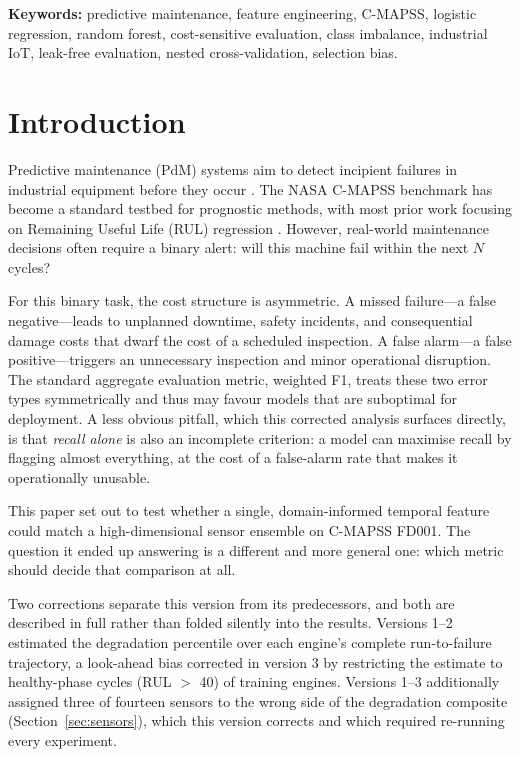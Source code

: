 \documentclass[10pt,twocolumn]{article}
\begin{document}
\noindent\textbf{Keywords:} predictive maintenance, feature engineering, C-MAPSS,
logistic regression, random forest, cost-sensitive evaluation, class imbalance,
industrial IoT, leak-free evaluation, nested cross-validation, selection bias.

\section{Introduction}
\label{sec:intro}

Predictive maintenance (PdM) systems aim to detect incipient failures in industrial
equipment before they occur \cite{jardine2006review}.
The NASA C-MAPSS benchmark \cite{saxena2008damage} has become a standard testbed for
prognostic methods, with most prior work focusing on Remaining Useful Life (RUL)
regression \cite{li2018remaining}.
However, real-world maintenance decisions often require a binary alert: will this
machine fail within the next $N$ cycles?

For this binary task, the cost structure is asymmetric.
A missed failure---a false negative---leads to unplanned downtime, safety incidents,
and consequential damage costs that dwarf the cost of a scheduled inspection.
A false alarm---a false positive---triggers an unnecessary inspection and minor
operational disruption.
The standard aggregate evaluation metric, weighted F1, treats these two error types
symmetrically and thus may favour models that are suboptimal for deployment.
A less obvious pitfall, which this corrected analysis surfaces directly, is that
\emph{recall alone} is also an incomplete criterion: a model can maximise recall by
flagging almost everything, at the cost of a false-alarm rate that makes it
operationally unusable.

This paper set out to test whether a single, domain-informed temporal feature could
match a high-dimensional sensor ensemble on C-MAPSS FD001. The question it ended up
answering is a different and more general one: which metric should decide that
comparison at all.

Two corrections separate this version from its predecessors, and both are described in
full rather than folded silently into the results. Versions 1--2 estimated the
degradation percentile over each engine's complete run-to-failure trajectory, a
look-ahead bias corrected in version 3 by restricting the estimate to healthy-phase
cycles (RUL $>$ 40) of training engines. Versions 1--3 additionally assigned three of
fourteen sensors to the wrong side of the degradation composite
(Section~\ref{sec:sensors}), which this version corrects and which required re-running
every experiment.
\end{document}
